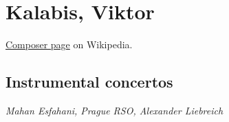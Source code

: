 \chapter{Kalabis, Viktor} %
\label{cha:kalabis}

\href{https://en.wikipedia.org/wiki/Viktor_Kalabis#:~:text=Viktor%20Kalabis%20(27%20February%201923,husband%20of%20harpsichordist%20Zuzana%20Růžičková.}{Composer page} on Wikipedia.

\section{Instrumental concertos}

 \textit{Mahan Esfahani, Prague RSO, Alexander Liebreich} \\
